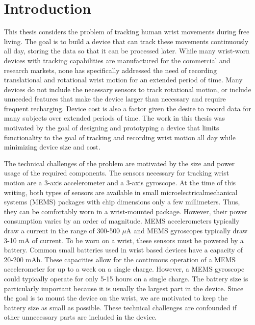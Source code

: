 
\chapter{Introduction}
\label{Chap:Intro}

This thesis considers the problem of tracking human wrist movements during free living.
The goal is to build a device that can track these movements continuously all day,
storing the data so that it can be processed later.
While many wrist-worn devices with tracking capabilities are manufactured for the commercial and research markets, none has specifically addressed the need of recording translational and rotational wrist motion for an extended period of time.  Many devices do not include the necessary sensors to track rotational motion, or include unneeded features that make the device larger than necessary and require frequent recharging.
Device cost is also a factor given the desire to record data for many subjects over extended periods of time.
The work in this thesis was motivated by the goal of designing and prototyping a device that limits functionality to the goal of tracking and recording wrist motion all day while minimizing device size and cost.

The technical challenges of the problem are motivated by the size and power usage of the required components.
The sensors necessary for tracking wrist motion are a 3-axis accelerometer and a 3-axis gyroscope.
At the time of this writing, both types of sensors are available in small microelectricalmechanical systems (MEMS) packages with chip dimensions only a few millimeters.
Thus, they can be comfortably worn in a wrist-mounted package.
However, their power consumption varies by an order of magnitude.  MEMS accelerometers typically draw a current in the range of 300-500 $\mu$A and MEMS gyroscopes typically draw 3-10 mA of current.
To be worn on a wrist, these sensors must be powered by a battery.
Common small batteries used in wrist based devices have a capacity of 20-200 mAh.
These capacities allow for the continuous operation of a MEMS accelerometer for up to a week on a single charge.
However, a MEMS gyroscope
could typically operate for only 5-15 hours on a single charge.
The battery size is particularly important because it is usually the largest part in the device.
Since the goal is to mount the device on the wrist,
we are motivated to keep the battery size as small as possible.
These technical challenges are confounded if other unnecessary parts are included in the device.


